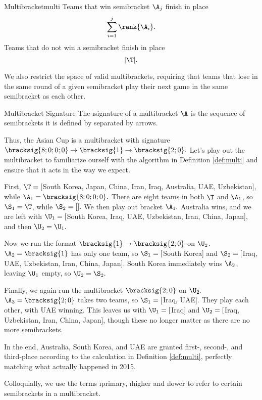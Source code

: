 {\begin{definition}{Multibracket}{multi}
        Teams that win semibracket $\A_j$ finish in place $$\sum_{i=1}^{j} \rank{\A_i}.$$
        Teams that do not win a semibracket finish in place $$|\T|.$$

        We also restrict the space of valid multibrackets, requiring that teams that lose in the same round of a given semibracket play their next game in the same semibracket as each other.
    \end{definition}

    \begin{definition}{Multibracket Signature}{}
        The \i{signature} of a multibracket $\A$ is the sequence of semibrackets it is defined by separated by arrows.
    \end{definition}

    Thus, the Asian Cup is a multibracket with signature $\bracksig{8;0;0;0} \to \bracksig{1} \to \bracksig{2;0}.$ Let's play out the multibracket to familiarize ourself with the algorithm in Definition \ref{def:multi} and ensure that it acts in the way we expect.


    First, $\T = [$South Korea, Japan, China, Iran, Iraq, Australia, UAE, Uzbekistan], while $\A_1 = \bracksig{8;0;0;0}.$ There are eight teams in both $\T$ and $\A_1$, so $\S_1 = \T$, while $\S_2 = [].$ We then play out bracket $\A_1.$ Australia wins, and we are left with $\U_1 = [$South Korea, Iraq, UAE, Uzbekistan, Iran, China, Japan], and then $\U_2 = \U_1.$

    Now we run the format $\bracksig{1} \to \bracksig{2;0}$ on $\U_2$. $\A_2 = \bracksig{1}$ has only one team, so $\S_1 =[$South Korea] and $\S_2 =[$Iraq, UAE, Uzbekistan, Iran, China, Japan]. South Korea immediately wins $\A_2$, leaving $\U_1$ empty, so $\U_2 = \S_2.$

    Finally, we again run the multibracket $\bracksig{2;0}$ on $\U_2.$ $\A_3 = \bracksig{2;0}$ takes two teams, so $\S_1 =[$Iraq, UAE]. They play each other, with UAE winning. This leaves us with $\U_1 = [$Iraq] and $\U_2 = [$Iraq, Uzbekistan, Iran, China, Japan], though these no longer matter as there are no more semibrackets.

    In the end, Australia, South Korea, and UAE are granted first-, second-, and third-place according to the calculation in Definition \ref{def:multi}, perfectly matching what actually happened in 2015.

    Colloquially, we use the terms \i{primary}, \i{higher} and \i{lower} to refer to certain semibrackets in a multibracket.

}
